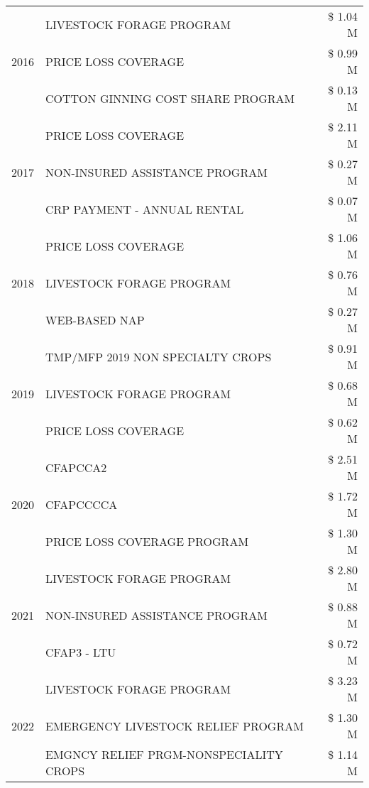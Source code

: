 \begin{tabular}{llr}
\cline{1-3}
\multirow[t]{3}{*}{2016} & LIVESTOCK FORAGE PROGRAM & \$ 1.04 M \\
 & PRICE LOSS COVERAGE & \$ 0.99 M \\
 & COTTON GINNING COST SHARE PROGRAM & \$ 0.13 M \\
\cline{1-3}
\multirow[t]{3}{*}{2017} & PRICE LOSS COVERAGE & \$ 2.11 M \\
 & NON-INSURED ASSISTANCE PROGRAM & \$ 0.27 M \\
 & CRP PAYMENT - ANNUAL RENTAL & \$ 0.07 M \\
\cline{1-3}
\multirow[t]{3}{*}{2018} & PRICE LOSS COVERAGE & \$ 1.06 M \\
 & LIVESTOCK FORAGE PROGRAM & \$ 0.76 M \\
 & WEB-BASED NAP & \$ 0.27 M \\
\cline{1-3}
\multirow[t]{3}{*}{2019} & TMP/MFP 2019 NON SPECIALTY CROPS & \$ 0.91 M \\
 & LIVESTOCK FORAGE PROGRAM & \$ 0.68 M \\
 & PRICE LOSS COVERAGE & \$ 0.62 M \\
\cline{1-3}
\multirow[t]{3}{*}{2020} & CFAPCCA2 & \$ 2.51 M \\
 & CFAPCCCCA & \$ 1.72 M \\
 & PRICE LOSS COVERAGE PROGRAM & \$ 1.30 M \\
\cline{1-3}
\multirow[t]{3}{*}{2021} & LIVESTOCK FORAGE PROGRAM & \$ 2.80 M \\
 & NON-INSURED ASSISTANCE PROGRAM & \$ 0.88 M \\
 & CFAP3 - LTU & \$ 0.72 M \\
\cline{1-3}
\multirow[t]{3}{*}{2022} & LIVESTOCK FORAGE PROGRAM & \$ 3.23 M \\
 & EMERGENCY LIVESTOCK RELIEF PROGRAM & \$ 1.30 M \\
 & EMGNCY RELIEF PRGM-NONSPECIALITY CROPS & \$ 1.14 M \\
\cline{1-3}
\bottomrule
\end{tabular}

